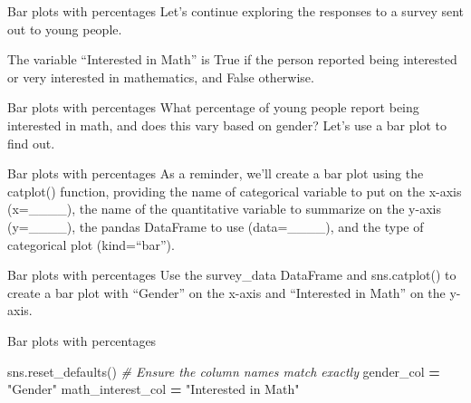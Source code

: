\documentclass[
  ignorenonframetext,
]{beamer}
\newenvironment{Shaded}{\begin{snugshade}}{\end{snugshade}}
\newcommand{\CommentTok}[1]{\textcolor[rgb]{0.56,0.35,0.01}{\textit{#1}}}
\newcommand{\NormalTok}[1]{#1}
\newcommand{\OperatorTok}[1]{\textcolor[rgb]{0.81,0.36,0.00}{\textbf{#1}}}
\newcommand{\StringTok}[1]{\textcolor[rgb]{0.31,0.60,0.02}{#1}}
\begin{document}
\begin{frame}{Bar plots with percentages}
\label{bar-plots-with-percentages}
Let's continue exploring the responses to a survey sent out to young
people.

The variable ``Interested in Math'' is True if the person reported being
interested or very interested in mathematics, and False otherwise.
\end{frame}

\begin{frame}{Bar plots with percentages}
\label{bar-plots-with-percentages-1}
What percentage of young people report being interested in math, and
does this vary based on gender? Let's use a bar plot to find out.
\end{frame}

\begin{frame}{Bar plots with percentages}
\label{bar-plots-with-percentages-2}
As a reminder, we'll create a bar plot using the catplot() function,
providing the name of categorical variable to put on the x-axis
(x=\_\_\_\_), the name of the quantitative variable to summarize on the
y-axis (y=\_\_\_\_), the pandas DataFrame to use (data=\_\_\_\_), and
the type of categorical plot (kind=``bar'').
\end{frame}

\begin{frame}{Bar plots with percentages}
\label{bar-plots-with-percentages-3}
Use the survey\_data DataFrame and sns.catplot() to create a bar plot
with ``Gender'' on the x-axis and ``Interested in Math'' on the y-axis.
\end{frame}

\begin{frame}[fragile]{Bar plots with percentages}
\label{bar-plots-with-percentages-4}

\begin{Shaded}
\begin{Highlighting}[]
\NormalTok{sns.reset\_defaults()}
\CommentTok{\# Ensure the column names match exactly}
\NormalTok{gender\_col }\OperatorTok{=} \StringTok{"Gender"}
\NormalTok{math\_interest\_col }\OperatorTok{=} \StringTok{"Interested in Math"}
\end{Highlighting}
\end{Shaded}
\end{frame}
\end{document}
